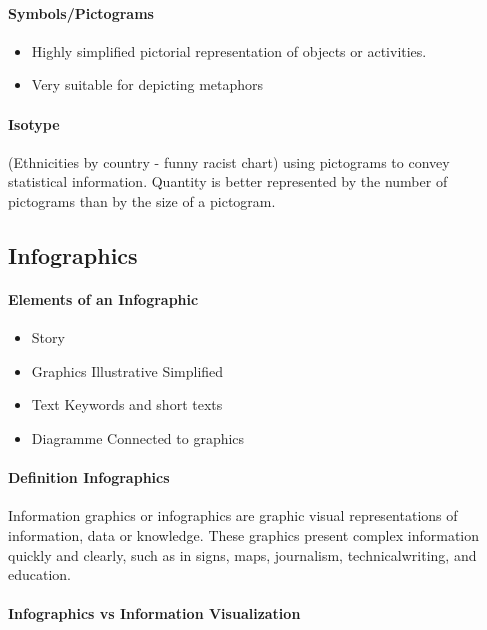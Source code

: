 \documentclass[10pt,a4paper]{article}
\begin{document}
			\paragraph{Symbols/Pictograms}
				\begin{itemize}
					\item Highly simplified pictorial representation of objects or activities.
					\item Very suitable for depicting metaphors
				\end{itemize}
			
			\paragraph{Isotype} (Ethnicities by country - funny racist chart) using pictograms to convey statistical information. Quantity is better represented by the number of pictograms than by the size of a pictogram.
			
		\subsection{Infographics}
			\paragraph{Elements of an Infographic}
				\begin{itemize}
					\item Story
					\item Graphics
					\subitem Illustrative
					\subitem Simplified
					\item Text
					\subitem Keywords and short texts
					\item Diagramme
					\subitem Connected to graphics
				\end{itemize}
			
			\paragraph{Definition Infographics} Information graphics or infographics are graphic visual representations of information, data or knowledge. These graphics present complex information quickly and clearly, such as in signs, maps, journalism, technicalwriting, and education.
		
			\paragraph{Infographics vs Information Visualization}
				
\end{document}
